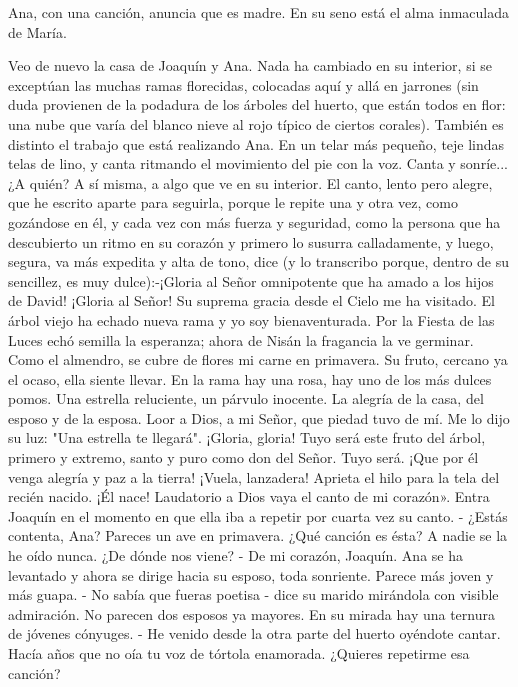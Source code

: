 \documentclass[12pt]{book} %
\begin{document}
Ana, con una canción, anuncia que es madre.
En su seno está el alma inmaculada de María. 
 
Veo de nuevo la casa de Joaquín y Ana. Nada ha cambiado en su interior, si se exceptúan las muchas ramas florecidas, 
colocadas aquí y allá en jarrones (sin duda provienen de la podadura de los árboles del huerto, que están todos en flor: una nube que varía del blanco nieve al rojo típico de ciertos corales). 
También es distinto el trabajo que está realizando Ana. En un telar más pequeño, teje lindas telas de lino, y canta 
ritmando el movimiento del pie con la voz. Canta y sonríe... ¿A quién? A sí misma, a algo que ve en su interior. 
El canto, lento pero alegre, que he escrito aparte para seguirla, porque le repite una y otra vez, como gozándose en él, y cada vez con más fuerza y seguridad, como la persona que ha descubierto un ritmo en su corazón y primero lo susurra calladamente, y luego, segura, va más expedita y alta de tono, dice (y lo transcribo porque, dentro de su sencillez, es muy dulce):-¡Gloria al Señor omnipotente que ha amado a los hijos de David! 
¡Gloria al Señor! 
Su suprema gracia desde el Cielo me ha visitado. 
El árbol viejo ha echado nueva rama y yo soy bienaventurada. 
Por la Fiesta de las Luces echó semilla la esperanza; 
ahora de Nisán la fragancia la ve germinar. 
Como el almendro, se cubre de flores mi carne en primavera. 
Su fruto, cercano ya el ocaso, ella siente llevar. 
En la rama hay una rosa, hay uno de los más dulces pomos. 
Una estrella reluciente, un párvulo inocente. 
La alegría de la casa, del esposo y de la esposa. 
Loor a Dios, a mi Señor, que piedad tuvo de mí. 
Me lo dijo su luz: "Una estrella te llegará". 
¡Gloria, gloria! Tuyo será este fruto del árbol, 
primero y extremo, santo y puro como don del Señor. 
Tuyo será. ¡Que por él venga alegría y paz a la tierra! 
¡Vuela, lanzadera! Aprieta el hilo para la tela del recién nacido. 
¡Él nace! Laudatorio a Dios vaya el canto de mi corazón». 
Entra Joaquín en el momento en que ella iba a repetir por cuarta vez su canto. 
- ¿Estás contenta, Ana? Pareces un ave en primavera. ¿Qué canción es ésta? A nadie se la he oído nunca. ¿De dónde nos viene? 
- De mi corazón, Joaquín. 
 Ana se ha levantado y ahora se dirige hacia su esposo, toda sonriente. Parece más joven y más guapa. 
- No sabía que fueras poetisa - dice su marido mirándola con visible admiración. No parecen dos esposos ya mayores. En su mirada hay una ternura de jóvenes cónyuges. 
- He venido desde la otra parte del huerto oyéndote cantar. Hacía años que no oía tu voz de tórtola enamorada. ¿Quieres repetirme esa canción? 
\end{document}
